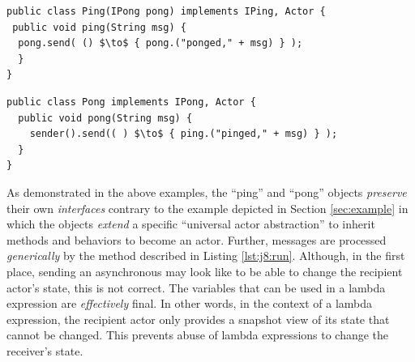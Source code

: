 \begin{center}
\begin{minipage}[t]{0.48\textwidth}
\begin{lstlisting}[mathescape, caption=Ping as an Actor,label=lst:ping]
public class Ping(IPong pong) implements IPing, Actor {
 public void ping(String msg) {
  pong.send( () $\to$ { pong.("ponged," + msg) } );
  }
}
\end{lstlisting}
\end{minipage}
\hfill
\begin{minipage}[t]{0.48\textwidth}
\begin{lstlisting}[mathescape, caption=Pong as an Actor,label=lst:pong]
public class Pong implements IPong, Actor {
  public void pong(String msg) {
    sender().send(( ) $\to$ { ping.("pinged," + msg) } );
  }
}
\end{lstlisting}
\end{minipage}
\end{center}

% 
As demonstrated in the above examples, the ``ping'' and ``pong'' objects \emph{preserve} 
their own \emph{interfaces}  contrary to the example depicted in Section \ref{sec:example} 
in which the objects \emph{extend} a specific ``universal actor abstraction'' to inherit methods and behaviors to become an actor.
Further,  messages are processed \emph{generically} by the  method described in Listing \ref{lst:j8:run}.
Although, in the first place, sending an asynchronous may look like to be able to change the recipient actor's state, this is not correct.
The variables that can be used in a lambda expression are \emph{effectively} final. 
In other words, in the context of a lambda expression, the recipient actor only provides a snapshot view of its state that cannot be changed.
This prevents abuse of lambda expressions to change the receiver's state.

% 

